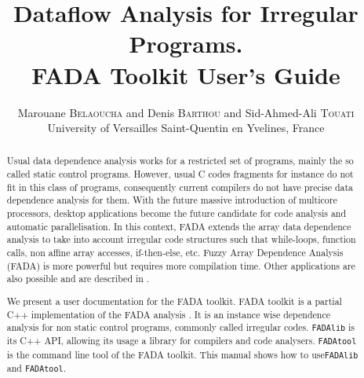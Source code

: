 \documentclass[a4paper,11pt]{article}
\title{Dataflow Analysis for Irregular Programs.\\FADA Toolkit User's Guide}
\author{Marouane \textsc{Belaoucha} and Denis \textsc{Barthou} and Sid-Ahmed-Ali \textsc{Touati}\\
University of Versailles Saint-Quentin en Yvelines, France
}
\begin{document}
\lstset{language=C++,
	basicstyle=\scriptsize,
	keywordstyle=\bfseries,
	numbers=left,
	numberstyle=\tiny,
	frameround=fttt
	}

\maketitle

\begin{abstract}
Usual data dependence analysis works for a restricted set of programs, mainly the so called static control programs. However, usual C codes fragments for instance do not fit in this class of programs,  consequently current compilers do not have precise data dependence analysis for them. With the future massive introduction of multicore processors, desktop applications become the future candidate for code analysis and automatic parallelisation. In this context, FADA extends the array data dependence analysis to take into account irregular code structures such that while-loops, function calls, non affine array accesses, if-then-else, etc. Fuzzy Array Dependence Analysis (FADA) is more powerful but requires more compilation time. Other applications are also possible and are described in \cite{d2.3.2}.

We present a user documentation for the FADA toolkit. FADA toolkit is a partial C++ implementation of the FADA analysis \cite{barthou_thesis}. It is an instance wise dependence analysis for non static control programs, commonly called irregular codes. \verb|FADAlib| is its C++ API, allowing its usage a library for compilers and code analysers. \verb|FADAtool| is the command line tool of the FADA toolkit. This manual shows how to use\verb|FADAlib| and  \verb|FADAtool|.
\end{abstract}
\tableofcontents




 









\end{document}
